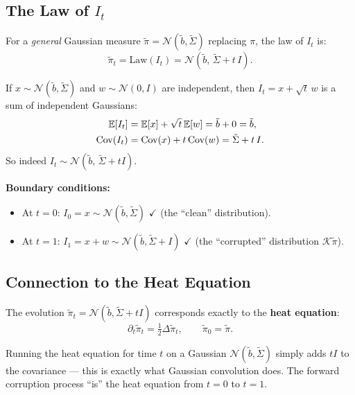 \documentclass[11pt, a4paper]{article}
\theoremstyle{definition}
\begin{document}
\subsection{The Law of $I_t$}

\begin{keyidea}
For a \emph{general} Gaussian measure $\tilde{\pi} = \mathcal{N}(\tilde{b}, \tilde{\Sigma})$ replacing $\pi$, the law of $I_t$ is:
\[
    \tilde{\pi}_t = \text{Law}(I_t) = \mathcal{N}(\tilde{b}, \, \tilde{\Sigma} + t\, I).
\]
\end{keyidea}

\begin{calculation}[title={Deriving the law of $I_t$}]
If $x \sim \mathcal{N}(\tilde{b}, \tilde{\Sigma})$ and $w \sim \mathcal{N}(0, I)$ are independent, then $I_t = x + \sqrt{t}\, w$ is a sum of independent Gaussians:
\begin{align}
    \mathbb{E}[I_t] &= \mathbb{E}[x] + \sqrt{t}\,\mathbb{E}[w] = \tilde{b} + 0 = \tilde{b}, \notag \\
    \text{Cov}(I_t) &= \text{Cov}(x) + t\,\text{Cov}(w) = \tilde{\Sigma} + t\, I. \notag
\end{align}
So indeed $I_t \sim \mathcal{N}(\tilde{b},\, \tilde{\Sigma} + tI)$.

\medskip\noindent\textbf{Boundary conditions:}
\begin{itemize}
    \item At $t=0$: $I_0 = x \sim \mathcal{N}(\tilde{b}, \tilde{\Sigma})$ \;$\checkmark$\; (the ``clean'' distribution).
    \item At $t=1$: $I_1 = x + w \sim \mathcal{N}(\tilde{b}, \tilde{\Sigma} + I)$ \;$\checkmark$\; (the ``corrupted'' distribution $\mathcal{K}\tilde{\pi}$).
\end{itemize}
\end{calculation}

\subsection{Connection to the Heat Equation}

The evolution $\tilde{\pi}_t = \mathcal{N}(\tilde{b}, \tilde{\Sigma} + tI)$ corresponds exactly to the \textbf{heat equation}:
\[
    \partial_t \tilde{\pi}_t = \tfrac{1}{2}\Delta \tilde{\pi}_t, \qquad \tilde{\pi}_0 = \tilde{\pi}.
\]

\begin{intuition}
Running the heat equation for time $t$ on a Gaussian $\mathcal{N}(\tilde{b}, \tilde{\Sigma})$ simply adds $tI$ to the covariance --- this is exactly what Gaussian convolution does. The forward corruption process ``is'' the heat equation from $t=0$ to $t=1$.
\end{intuition}
\end{document}
